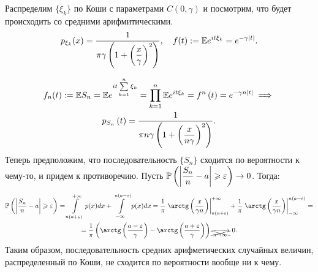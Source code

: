 \documentclass[../TV&MS.tex]{subfiles}
\begin{document}
\begin{Ex}
    Распределим $\{ \xi_k \}$ по Коши с параметрами $C(0, \gamma)$ и посмотрим, что будет происходить со средними арифмитическими.
    \[
        p_{\xi_k} (x) = \dfrac{1}{\pi \gamma \left( 1 + \left( \dfrac{x}{\gamma} \right) ^2 \right) }, \quad
        f(t) :=  \mathbb{E} e^{it\xi_k} = e^{-\gamma \left| t \right| }
    .\]

    \begin{multline*}
        f_n(t) := \mathbb{E} S_n = 
        \mathbb{E} e^{it \sum\limits_{k=1}^{n} \xi_k} = 
        \prod\limits_{k=1}^{n} \mathbb{E} e^{it\xi_k} = 
        f^{n} \left( t \right) =
        e^{-\gamma n \left| t \right| } \implies \\
        p_{S_n} \left( t \right) = \dfrac{1}{\pi n \gamma \left( 1 + \left( \dfrac{x}{n \gamma} \right)^2 \right) }
    .\end{multline*}
    Теперь предположим, что последовательность $\{ S_n \} $ сходится по вероятности к чему-то, и придем к противоречию.
    Пусть $\mathbb{P} \left( \left| \dfrac{S_n}{n} - a \right| \geqslant \varepsilon \right) \rightarrow 0$. Тогда:
    \begin{multline*}
        \Pro \left( \left| \dfrac{S_n}{n} - a \right| \geqslant \varepsilon \right) = \int\limits_{n(a+\varepsilon)}^{+\infty} p(x)dx + \int\limits_{-\infty}^{n(a - \varepsilon)} p(x)dx = 
        \dfrac{1}{\pi} \left. \arctg \left( \dfrac{x}{\gamma n} \right) \right|_{n(a+\varepsilon)}^{+\infty} + 
        \dfrac{1}{\pi} \left. \arctg \left( \dfrac{x}{\gamma n} \right) \right|_{-\infty}^{n(a - \varepsilon)} = \\
        = \dfrac{1}{\pi} \left( \arctg \left( \dfrac{a - \varepsilon}{\gamma} \right) - \arctg \left( \dfrac{a + \varepsilon}{\gamma} \right)  \right) 
        \xcancel{ \xrightarrow[n \rightarrow \infty]{}} \ 0
    .\end{multline*}
    Таким образом, последовательность средних арифметических случайных величин, распределенный по Коши, не сходится по вероятности вообще ни к чему.
\end{Ex} 

\newpage
\end{document}
